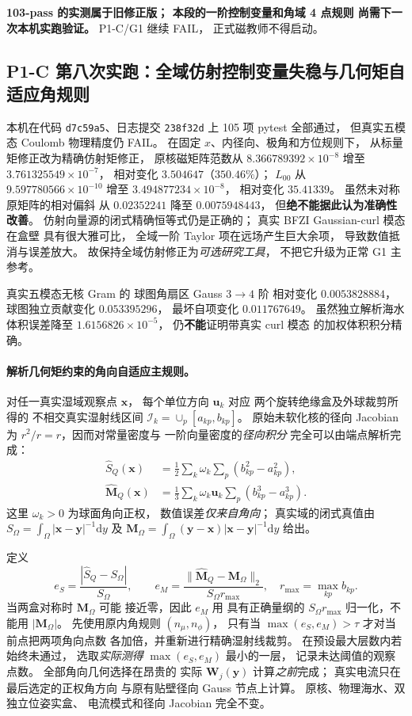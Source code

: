 \textbf{103-pass 的实测属于旧修正版；
本段的一阶控制变量和角域 4 点规则
尚需下一次本机实跑验证。}
P1-C/G1 继续 FAIL，
正式磁教师不得启动。


\subsection{P1-C 第八次实跑：全域仿射控制变量失稳与几何矩自适应角规则}
\label{sec:p1-c-geometric-moment-angular-adaptivity}
本机在代码 \texttt{d7c59a5}、日志提交
\texttt{238f32d} 上 105 项 pytest 全部通过，
但真实五模态 Coulomb 物理精度仍 FAIL。
在固定 $x$、内径向、极角和方位规则下，
从标量矩修正改为精确仿射矩修正，
原核磁矩阵范数从
$8.366789392\times10^{-8}$ 增至
$3.761325549\times10^{-7}$，
相对变化 $3.504647$（$350.46\%$）；
$L_{00}$ 从 $9.597780566\times10^{-10}$
增至 $3.494877234\times10^{-8}$，
相对变化 $35.41339$。
虽然未对称原矩阵的相对偏斜
从 $0.02352241$ 降至 $0.0075948443$，
但\textbf{绝不能据此认为准确性改善}。
仿射向量源的闭式精确恒等式仍是正确的；
真实 BFZI Gaussian-curl 模态在盒壁
具有很大雅可比，
全域一阶 Taylor 项在远场产生巨大余项，
导致数值抵消与误差放大。
故保持全域仿射修正为\emph{可选研究工具}，
不把它升级为正常 G1 主参考。

真实五模态无核 Gram 的
球图角扇区 Gauss $3\to4$ 阶
相对变化 $0.0053828884$，
球图独立贡献变化 $0.053395296$，
最坏自项变化 $0.011767649$。
虽然独立解析海水体积误差降至
$1.6156826\times10^{-5}$，
仍\textbf{不能}证明带真实 curl 模态
的加权体积积分精确。

\paragraph{解析几何矩约束的角向自适应主规则。}
对任一真实湿域观察点 $\bm x$，
每个单位方向 $\bm u_k$ 对应
两个旋转绝缘盒及外球裁剪所得的
不相交真实湿射线区间
$\mathcal I_k=\cup_p[a_{kp},b_{kp}]$。
原始未软化核的径向 Jacobian 为
$r^2/r=r$，因而对常量密度与
一阶向量密度的\emph{径向积分}
完全可以由端点解析完成：
\begin{align}
 \widehat S_Q(\bm x)
 &=\frac12\sum_k\omega_k\sum_p
       (b_{kp}^2-a_{kp}^2),\\
 \widehat{\bm M}_Q(\bm x)
 &=\frac13\sum_k\omega_k\bm u_k
       \sum_p(b_{kp}^3-a_{kp}^3).
\end{align}
这里 $\omega_k>0$ 为球面角向正权，
数值误差\emph{仅来自角向}；
真实域的闭式真值由
$S_\Omega=\int_\Omega|\bm x-\bm y|^{-1}\mathrm dy$
及
$\bm M_\Omega=\int_\Omega
(\bm y-\bm x)|\bm x-\bm y|^{-1}\mathrm dy$
给出。

定义
\[
 e_S=\frac{|\widehat S_Q-S_\Omega|}{S_\Omega},
 \qquad
 e_M=\frac{\|\widehat{\bm M}_Q-\bm M_\Omega\|_2}
           {S_\Omega r_{\max}},
 \quad
 r_{\max}=\max_{kp}b_{kp}.
\]
当两盒对称时 $\bm M_\Omega$ 可能
接近零，因此 $e_M$ 用
具有正确量纲的 $S_\Omega r_{\max}$
归一化，不能用 $|\bm M_\Omega|$。
先使用原内角规则
$(n_\mu,n_\phi)$，
只有当 $\max(e_S,e_M)>\tau$
才对当前点把两项角向点数
各加倍，并重新进行精确湿射线裁剪。
在预设最大层数内若始终未通过，
选取\emph{实际测得}
$\max(e_S,e_M)$ 最小的一层，
记录未达阈值的观察点数。
全部角向几何选择在昂贵的
实际 $\bm W_j(\bm y)$ 计算\emph{之前}完成；
真实电流只在最后选定的正权角方向
与原有贴壁径向 Gauss 节点上计算。
原核、物理海水、双独立位姿实盒、
电流模式和径向 Jacobian 完全不变。

